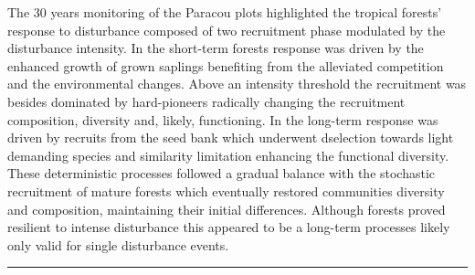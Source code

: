 \documentclass[fleqn,10pt]{ArtEcoFoG} %
\begin{document}
The 30 years monitoring of the Paracou plots highlighted the tropical
forests' response to disturbance composed of two recruitment phase
modulated by the disturbance intensity. In the short-term forests
response was driven by the enhanced growth of grown saplings benefiting
from the alleviated competition and the environmental changes. Above an
intensity threshold the recruitment was besides dominated by
hard-pioneers radically changing the recruitment composition, diversity
and, likely, functioning. In the long-term response was driven by
recruits from the seed bank which underwent dselection towards light
demanding species and similarity limitation enhancing the functional
diversity. These deterministic processes followed a gradual balance with
the stochastic recruitment of mature forests which eventually restored
communities diversity and composition, maintaining their initial
differences. Although forests proved resilient to intense disturbance
this appeared to be a long-term processes likely only valid for single
disturbance events.

\begin{center}\rule{0.5\linewidth}{\linethickness}\end{center}





\end{document}

